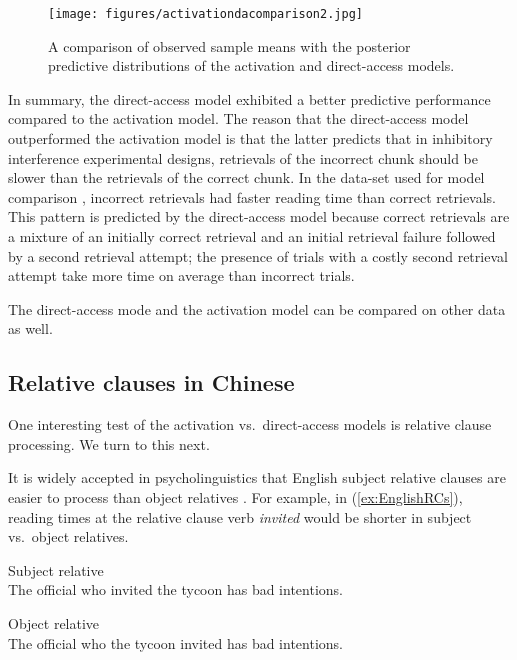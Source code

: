 \documentclass{cambridge7A}\usepackage[]{graphicx}\usepackage[]{color}
\begin{document}
\begin{figure}[!htbp]
\begin{center}
\texttt{[image: figures/activationdacomparison2.jpg]}
\end{center}
\caption{A comparison of observed sample means with the posterior predictive distributions of the activation and direct-access models.} \label{fig:daactcomparison}
\end{figure}

In summary, the direct-access model exhibited a better predictive performance compared to the activation model. The reason that the direct-access model outperformed the activation model is that the latter predicts that in inhibitory interference experimental designs, retrievals of the incorrect chunk should be slower than the retrievals of the correct chunk. In the data-set used for model comparison \citep{nicenboimexploratory}, incorrect retrievals had faster reading time than correct retrievals. This pattern is  predicted by the direct-access model because correct retrievals are a mixture of an initially correct retrieval and an initial retrieval failure followed by a second retrieval attempt; the presence of trials with a costly second retrieval attempt take more time on average than incorrect trials.

The direct-access mode and the activation model can be compared on other data as well.

\subsection{Relative clauses in Chinese} \label{rchinese}

One interesting test of the activation vs.\ direct-access models is relative clause processing. We turn to this next.

It is widely accepted in psycholinguistics that  English subject relative clauses are easier to process than object relatives \citep[e.g.,][]{grodner}. For example, in (\ref{ex:EnglishRCs}), reading times at the relative clause verb \textit{invited} would be shorter in  subject vs.\ object relatives.

\begin{exe}
\ex  \label{ex:EnglishRCs}
\begin{xlist}
\item Subject relative\\
The official who invited the tycoon has bad intentions.
\item 
Object relative \\
The official who the tycoon invited has bad intentions.
\end{xlist}
\end{exe}
\end{document}
